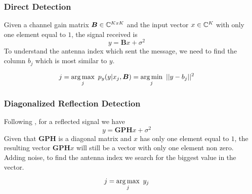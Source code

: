 \subsubsection{Direct Detection}
Given a channel gain matrix $\bm{B} \in \mathbb{C}^{KxK}$ and the input vector $x \in \mathbb{C}^K$ with only one element equal to $1$, the signal received is
\begin{equation}
  y = \bm{B}x + \sigma^2
\end{equation}
To understand the antenna index which sent the message, we need to find the column $b_j$ which is most similar to $y$.

\begin{equation}
  j = \operatorname*{arg\,max}_j\ p_y (y | x_j, \bm{B}) = \operatorname*{arg\,min}_j\ || y - b_j ||^2
  \label{eq:direct_detection}
\end{equation}

\subsubsection{Diagonalized Reflection Detection}
Following \cite{9328149}, for a reflected signal we have
\begin{equation}
  y = \bm{GPH}x + \sigma^2
\end{equation}
Given that $\bm{GPH}$ is a diagonal matrix and $x$ has only one element equal to $1$, the resulting vector $\bm{GPH}x$ will still be a vector with only one element non zero. Adding noise, to find the antenna index we search for the biggest value in the vector.

\begin{equation}
  j = \operatorname*{arg\,max}_j\ y_j
  \label{eq:reflection_detection}
\end{equation}